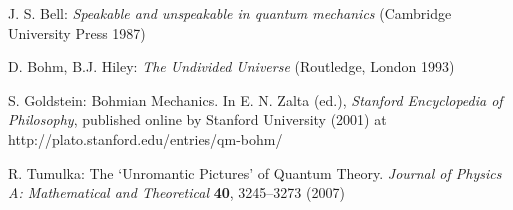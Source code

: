 \documentclass[12pt]{report}
\begin{document}
\begin{thebibliography}{100}
 J. S. Bell: \textit{Speakable and unspeakable in
    quantum mechanics} (Cambridge University Press 1987)

 D. Bohm, B.J. Hiley: 
  \textit{The Undivided Universe} 
  (Routledge, London 1993)  

 S. Goldstein: Bohmian Mechanics. 
  In E. N. Zalta (ed.), \textit{Stanford Encyclopedia of Philosophy}, 
  published online by Stanford University (2001) at\\
  http://plato.stanford.edu/entries/qm-bohm/




 R. Tumulka:
	The `Unromantic Pictures' of Quantum Theory.
	\textit{Journal of Physics A: Mathematical and Theoretical} 
	\textbf{40}, 3245--3273 (2007)

\end{thebibliography}
\end{document}
